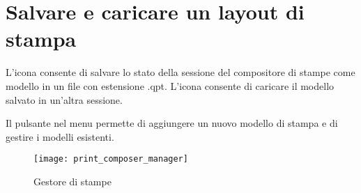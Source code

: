 \section{Salvare e caricare un layout di stampa}

L'icona  consente di salvare 
lo stato della sessione del compositore di stampe come modello in un file con estensione .qpt.
L'icona  consente di caricare il modello 
salvato in un'altra sessione.

Il pulsante  nel menu  
permette di aggiungere un nuovo modello di stampa e di gestire i modelli esistenti.

\begin{figure}[h]
   \centering
   \texttt{[image: print\_composer\_manager]}
   \caption{Gestore di stampe \nixcaption}
   \label{fig:print_composer_manager}
\end{figure}

\FloatBarrier
